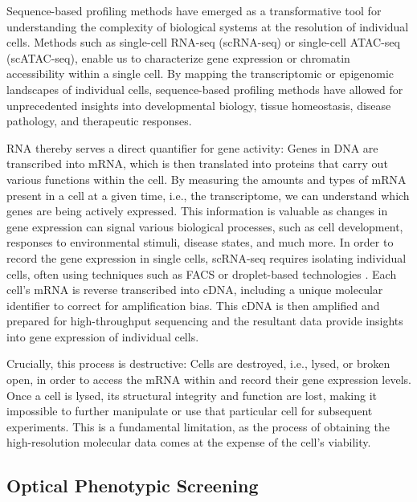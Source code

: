 Sequence-based profiling methods have emerged as a transformative tool for understanding the complexity of biological systems at the resolution of individual cells. Methods such as single-cell \acrlong{RNA-seq} (scRNA-seq) or single-cell \acrlong{ATAC-seq} (scATAC-seq), enable us to characterize gene expression or chromatin accessibility within a single cell.
By mapping the transcriptomic or epigenomic landscapes of individual cells, sequence-based profiling methods have allowed for unprecedented insights into developmental biology, tissue homeostasis, disease pathology, and therapeutic responses.

RNA thereby serves a direct quantifier for gene activity: Genes in DNA are transcribed into \acrfull{mRNA}, which is then translated into proteins that carry out various functions within the cell.
By measuring the amounts and types of mRNA present in a cell at a given time, i.e., the transcriptome, we can understand which genes are being actively expressed. This information is valuable as changes in gene expression can signal various biological processes, such as cell development, responses to environmental stimuli, disease states, and much more. 
In order to record the gene expression in single cells, scRNA-seq requires isolating individual cells, often using techniques such as \acrfull{FACS} \citep{julius1972demonstration} or droplet-based technologies \citep{brouzes2009droplet, mazutis2013single, debs2012functional}. Each cell's mRNA is reverse transcribed into \acrfull{cDNA}, including a unique molecular identifier to correct for amplification bias.
This cDNA is then amplified and prepared for high-throughput sequencing and the resultant data provide insights into gene expression of individual cells.

Crucially, this process is destructive: Cells are destroyed, i.e., lysed, or broken open, in order to access the mRNA within and record their gene expression levels.
Once a cell is lysed, its structural integrity and function are lost, making it impossible to further manipulate or use that particular cell for subsequent experiments.
This is a fundamental limitation, as the process of obtaining the high-resolution molecular data comes at the expense of the cell's viability.

\subsection{Optical Phenotypic Screening}
\label{sec:background_imaging}

